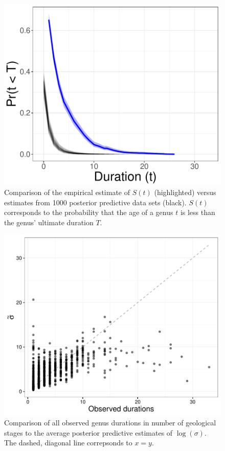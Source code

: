 \documentclass{article}
\begin{document}
\begin{figure}[ht]
  \centering
  \includegraphics[height = 0.5\textheight,width=\textwidth,keepaspectratio=true]{figure/survival_curves}
  \caption{Comparison of the empirical estimate of \(S(t)\) (highlighted) versus estimates from 1000 posterior predictive data sets (black). \(S(t)\) corresponds to the probability that the age of a genus \(t\) is less than the genus' ultimate duration \(T\).}
  \label{fig:surv}
\end{figure}

\begin{figure}[ht]
  \centering
  \includegraphics[height = 0.5\textheight,width=\textwidth,keepaspectratio=true]{figure/shotgun}
  \caption{Comparison of all observed genus durations in number of geological stages to the average posterior predictive estimates of \(\log(\sigma)\). The dashed, diagonal line correpsonds to \(x = y\).}
  \label{fig:shot}
\end{figure}
\end{document}
